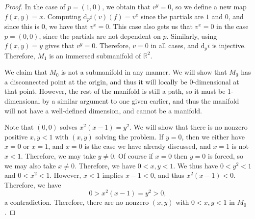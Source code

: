 \documentclass[11pt, letterpaper]{article}
\theoremstyle{plain}
\begin{document}
\begin{proof}
In the case of $p=(1,0)$, we obtain that $v^y=0$, so we define a new map $f(x,y)=x$. Computing $\mathrm{d}_p i(v)(f)=v^x$ since the partials are $1$ and 0, and since this is 0, we have that $v^x=0$. This case also gets us that $v^x=0$ in the case $p=(0,0)$, since the partials are not dependent on $p$. Similarly, using $f(x,y)=y$ gives that $v^y=0$. Therefore, $v=0$ in all cases, and $\mathrm{d} _p i$ is injective. Therefore, $M_1$ is an immersed submanifold of $\mathbb{R} ^2$.

We claim that $M_0$ is not a submanifold in any manner. We will show that $M_0$ has a disconnected point at the origin, and thus it will locally be 0-dimensional at that point. However, the rest of the manifold is still a path, so it must be 1-dimensional by a similar argument to one given earlier, and thus the manifold will not have a well-defined dimension, and cannot be a manifold.

Note that $(0,0)$ solves $x^2(x-1)=y^2$. We will show that there is no nonzero positive $x,y<1$ with $(x,y)$ solving the problem. If $y=0$, then we either have $x=0$ or $x=1$, and $x=0$ is the case we have already discussed, and $x=1$ is not $x<1$. Therefore, we may take $y\neq 0$. Of course if $x=0$ then $y=0$ is forced, so we may also take $x\neq 0$. Therefore, we have $0<x,y<1$. We thus have $0<y^2<1$ and $0<x^2<1$. However, $x<1$ implies $x-1<0$, and thus $x^2(x-1)<0$. Therefore, we have
\[
	0>x^2(x-1)=y^2>0,
\]
a contradiction. Therefore, there are no nonzero $(x,y)$ with $0<x,y<1$ in $M_0$.
\end{proof}
\end{document}
